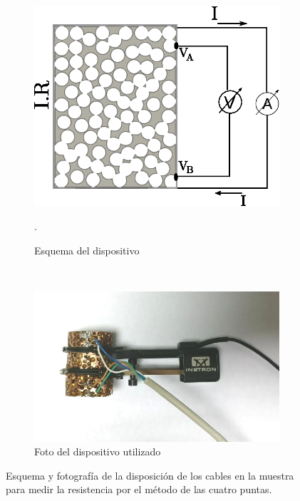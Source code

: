 \documentclass[a4paper,12pt,fleqn,twoside,openany]{book}
\begin{document}
 \begin{figure}
    \centering
    \begin{subfigure}{0.4\textwidth}
        \includegraphics[width=\textwidth]{Img/Procedimiento/CuatroPuntas1.eps}
	\caption{Esquema del dispositivo}. 
	\label{fig:CuatroPuntas}
    \end{subfigure}
    ~ %
    \begin{subfigure}{0.4\textwidth}
        \includegraphics[width=\textwidth]{Img/Procedimiento/cpfoto.jpg}
        \caption{Foto del dispositivo utilizado}
        \label{fig:cuatropuntasyextensometro}
    \end{subfigure}
    \caption{Esquema y fotografía de la disposición de los cables en la muestra para medir la resistencia por el método de las cuatro puntas. }
\end{figure}
\end{document}
